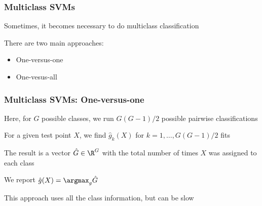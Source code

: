 \documentclass[12pt]{beamer}
\begin{document}

\begin{frame}
\frametitle{Multiclass SVMs}
Sometimes, it becomes necessary to do multiclass classification

\vsp
There are two main approaches:

\begin{itemize}
\item One-versus-one
\item One-vesus-all
\end{itemize}
\end{frame}

\begin{frame}
\frametitle{Multiclass SVMs: One-versus-one}
Here, for $G$ possible classes, we run $G(G-1)/2$ possible
pairwise classifications 

\vsp
For a given test point $X$, we find $\hat{g}_k(X)$ for $k = 1,\ldots, G(G-1)/2$ fits

\vsp
The result is a vector $\hat{G} \in \R^G$ with the total number of times $X$ was assigned to each class

\vsp
We report $\hat{g}(X) = \argmax_g \hat{G}$

\vsp
This approach uses all the class information, but can be  slow
\end{frame}
\end{document}
